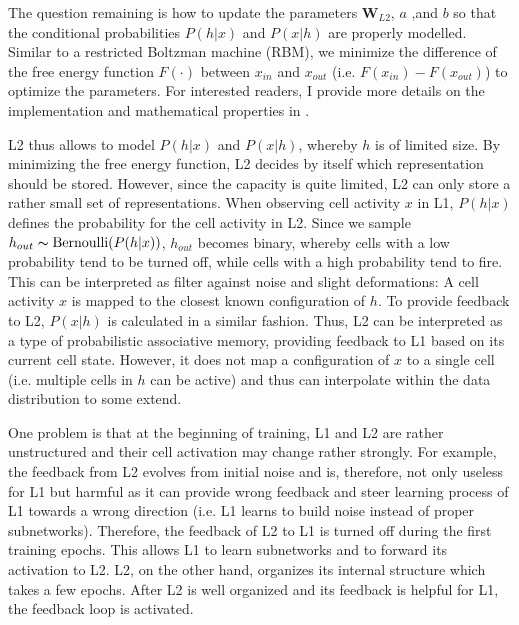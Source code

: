 The question remaining is how to update the parameters $\boldsymbol{W}_{L2}$, $a$ ,and $b$ so that the conditional probabilities $P(h|x)$ and $P(x|h)$ are properly modelled.
Similar to a restricted Boltzman machine (RBM), we minimize the difference of the free energy function $F(\cdot)$ between $x_{in}$ and $x_{out}$ (i.e. $F(x_{in}) - F(x_{out})$) to optimize the parameters. For interested readers, I provide more details on the implementation and mathematical properties in .

L2 thus allows to model $P(h|x)$ and $P(x|h)$, whereby $h$ is of limited size.
By minimizing the free energy function, L2 decides by itself which representation should be stored.
However, since the capacity is quite limited, L2 can only store a rather small set of representations.
When observing cell activity $x$ in L1, $P(h|x)$ defines the probability for the cell activity in L2. Since we sample $h_{out} \thicksim \text{Bernoulli}(P(h | x) )$, $h_{out}$ becomes binary, whereby cells with a low probability tend to be turned off, while cells with a high probability tend to fire.
This can be interpreted as filter against noise and slight deformations: A cell activity $x$ is mapped to the closest known configuration of $h$.
To provide feedback to L2, $P(x|h)$ is calculated in a similar fashion. Thus, L2 can be interpreted as a type of probabilistic associative memory, providing feedback to L1 based on its current cell state.
However, it does not map a configuration of $x$ to a single cell (i.e. multiple cells in $h$ can be active) and thus can interpolate within the data distribution to some extend.

One problem is that at the beginning of training, L1 and L2 are rather unstructured and their cell activation may change rather strongly.
For example, the feedback from L2 evolves from initial noise and is, therefore, not only useless for L1 but harmful as it can provide wrong feedback and steer learning process of L1 towards a wrong direction (i.e. L1 learns to build noise instead of proper subnetworks).
Therefore, the feedback of L2 to L1 is turned off during the first training epochs.
This allows L1 to learn subnetworks and to forward its activation to L2. L2, on the other hand, organizes its internal structure which takes a few epochs.
After L2 is well organized and its feedback is helpful for L1, the feedback loop is activated.



